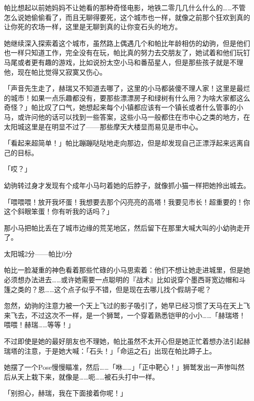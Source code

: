 帕比想起以前她妈妈不让她看的那种奇怪电影，地铁二零几几什么什么的……不管怎么说她偷偷看了，而且无聊得要死，这个城市也一样，就像之前那个狂欢到真的让你死的农场一样，这里是无聊到真的让你变石头的地方。

她继续深入探索着这个城市，虽然路上偶遇几个和帕比年龄相仿的幼驹，但是他们也一样只知道工作，完全没有在玩，帕比真的努力去交朋友了，她试着和他们玩钉马尾或者更有趣的游戏，比如说扮太空小马和番茄星人，但是那些孩子就是不理他，现在帕比觉得又寂寞又伤心。

「声音先生走了，赫瑞又不知道去哪了，这里的小马都装傻不理人家！这里是最烂的城市！如果一点乐趣都没有，要那些漂漂房子和绿树有什么用？为啥大家都这么奇怪？」帕比叹了口气，她想起来每个小镇都应该有一个镇长或者什么管事的小马，或许问他的话可以找到一些答案，这些小马一般都住在市中心之类的地方，在太阳城这里是在明显不过了——那些摩天大楼显而易见是市中心。

「看起来超简单！」帕比蹦蹦哒哒地走向那边，但是却发现自己正漂浮起来远离自己的目标。

「哎？」

幼驹转过身才发现有个成年小马叼着她的后脖子，就像抓小猫一样把她拎出城去。

「喂喂喂！放开我坏蛋！我想要去那个闪亮亮的高塔！我要见市长！超重要的！你这个斜眼笨蛋！你有听我的话吗？」

那小马把帕比丢在了城市边缘的荒芜地区，然后留下在那里大喊大叫的小幼驹走开了。

\begin{center}
太阳城2分——帕比0分
\end{center}


\horizonline


帕比一脸凝重的神色看着那些忙碌的小马思索着：他们不想让她走进城里，但是她必须想办法进去……或许她需要一点聪明的『战术』比如说穿个墨西哥宽边帽和斗篷之类的？恩……这个点子似乎不错，但是现在去哪儿找个假胡子呢？

忽然，幼驹的注意力被一个天上飞过的影子吸引了，她早已经习惯了天马在天上飞来飞去，不过这次不一样，是一个狮鹫，一个穿着熟悉铠甲的小小……「赫瑞塔！喂喂！赫瑞……等等！」

不过即使是她的最好朋友也不理她，帕比虽然不太开心但是她正忙着想办法引起赫瑞塔的注意，于是她大喊：「石头！」「命运之石」出现在帕比蹄子上。

她摆了一个Pose慢慢瞄准，然后……「咻……」「正中靶心！」狮鹫发出一声惨叫然后从天上栽下来，就像是……呃……被石头打中一样。

「别担心，赫瑞，我在下面接着你呢！」

